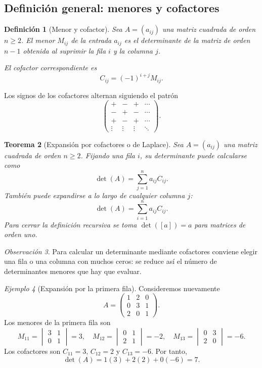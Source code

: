 \documentclass[12pt]{article}
\newtheorem{definicion}{Definición}[section]
\newtheorem{teorema}[definicion]{Teorema}
\theoremstyle{remark}
\newtheorem{observacion}[definicion]{Observación}
\newtheorem{ejemplo}[definicion]{Ejemplo}
\begin{document}
\subsection*{Definición general: menores y cofactores}
\begin{definicion}[Menor y cofactor]
Sea $A=(a_{ij})$ una matriz cuadrada de orden $n\ge2$. El \emph{menor} $M_{ij}$ de la entrada $a_{ij}$ es el determinante de la matriz de orden $n-1$ obtenida al suprimir la fila $i$ y la columna $j$.

El \emph{cofactor} correspondiente es
\[
C_{ij}=(-1)^{i+j}M_{ij}.
\]
\end{definicion}

Los signos de los cofactores alternan siguiendo el patrón
\[
\begin{pmatrix}
+&-&+&\cdots\\-&+&-&\cdots\\+&-&+&\cdots\\\vdots&\vdots&\vdots&\ddots
\end{pmatrix}.
\]

\begin{teorema}[Expansión por cofactores o de Laplace]
Sea $A=(a_{ij})$ una matriz cuadrada de orden $n\ge2$. Fijando una fila $i$, su determinante puede calcularse como
\[
\boxed{\det(A)=\sum_{j=1}^{n}a_{ij}C_{ij}.}
\]
También puede expandirse a lo largo de cualquier columna $j$:
\[
\det(A)=\sum_{i=1}^{n}a_{ij}C_{ij}.
\]
Para cerrar la definición recursiva se toma $\det([a])=a$ para matrices de orden uno.
\end{teorema}

\begin{observacion}
Para calcular un determinante mediante cofactores conviene elegir una fila o una columna con muchos ceros: se reduce así el número de determinantes menores que hay que evaluar.
\end{observacion}

\begin{ejemplo}[Expansión por la primera fila]
Consideremos nuevamente
\[
A=\begin{pmatrix}1&2&0\\0&3&1\\2&0&1\end{pmatrix}.
\]
Los menores de la primera fila son
\[
M_{11}=\begin{vmatrix}3&1\\0&1\end{vmatrix}=3,\quad
M_{12}=\begin{vmatrix}0&1\\2&1\end{vmatrix}=-2,\quad
M_{13}=\begin{vmatrix}0&3\\2&0\end{vmatrix}=-6.
\]
Los cofactores son $C_{11}=3$, $C_{12}=2$ y $C_{13}=-6$. Por tanto,
\[
\det(A)=1(3)+2(2)+0(-6)=\boxed{7}.
\]
\end{ejemplo}
\end{document}

